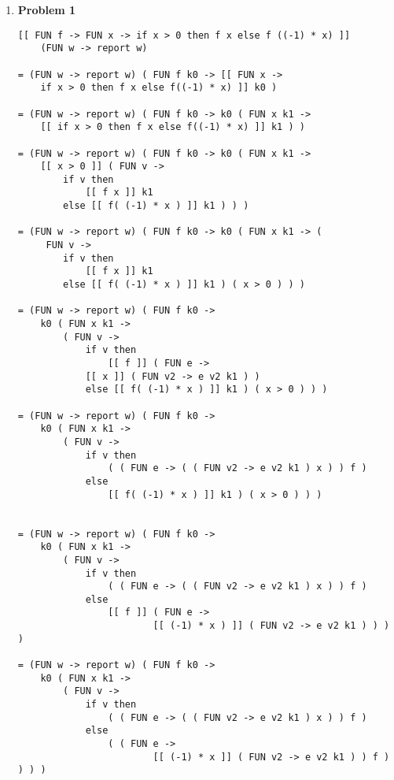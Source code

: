 
\usepackage{algorithm}
\usepackage{listings}
\usepackage{graphicx,amssymb,amsmath}
\usepackage{epstopdf}
\sloppy

\oddsidemargin 0in
\evensidemargin 0in
\textwidth 6.5in
\topmargin -0.5in
\textheight 9.0in




\pagestyle{myheadings}  %
	 	
\begin{enumerate}

	\item[]{\textbf{Problem 1}}
	
	\begin{lstlisting}
[[ FUN f -> FUN x -> if x > 0 then f x else f ((-1) * x) ]] 
	(FUN w -> report w)

= (FUN w -> report w) ( FUN f k0 -> [[ FUN x -> 
	if x > 0 then f x else f((-1) * x) ]] k0 )

= (FUN w -> report w) ( FUN f k0 -> k0 ( FUN x k1 -> 
	[[ if x > 0 then f x else f((-1) * x) ]] k1 ) )

= (FUN w -> report w) ( FUN f k0 -> k0 ( FUN x k1 -> 
	[[ x > 0 ]] ( FUN v -> 
		if v then 
			[[ f x ]] k1 
		else [[ f( (-1) * x ) ]] k1 ) ) )

= (FUN w -> report w) ( FUN f k0 -> k0 ( FUN x k1 -> (
	 FUN v -> 
	 	if v then 
			[[ f x ]] k1 
		else [[ f( (-1) * x ) ]] k1 ) ( x > 0 ) ) )

= (FUN w -> report w) ( FUN f k0 ->
    k0 ( FUN x k1 ->
        ( FUN v ->
            if v then 
            	[[ f ]] ( FUN e ->
			[[ x ]] ( FUN v2 -> e v2 k1 ) ) 
            else [[ f( (-1) * x ) ]] k1 ) ( x > 0 ) ) )

= (FUN w -> report w) ( FUN f k0 ->
    k0 ( FUN x k1 ->
        ( FUN v ->
            if v then
                ( ( FUN e -> ( ( FUN v2 -> e v2 k1 ) x ) ) f )
            else
                [[ f( (-1) * x ) ]] k1 ) ( x > 0 ) ) )
                

= (FUN w -> report w) ( FUN f k0 ->
    k0 ( FUN x k1 ->
        ( FUN v ->
            if v then
                ( ( FUN e -> ( ( FUN v2 -> e v2 k1 ) x ) ) f )
            else
                [[ f ]] ( FUN e -> 
                        [[ (-1) * x ) ]] ( FUN v2 -> e v2 k1 ) ) ) )

= (FUN w -> report w) ( FUN f k0 ->
    k0 ( FUN x k1 ->
        ( FUN v ->
            if v then
                ( ( FUN e -> ( ( FUN v2 -> e v2 k1 ) x ) ) f )
            else
                ( ( FUN e -> 
                        [[ (-1) * x ]] ( FUN v2 -> e v2 k1 ) ) f ) ) ) )


\end{lstlisting}
\end{enumerate}
